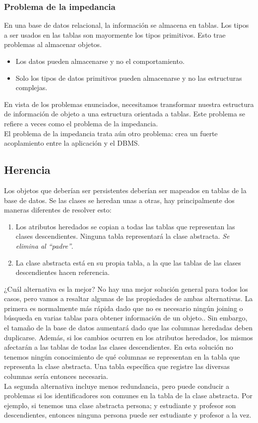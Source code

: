 \subsubsection{Problema de la impedancia}
En una base de datos relacional, la información se almacena en tablas. Los tipos a ser usados en las tablas son mayormente los tipos primitivos. Esto trae problemas al almacenar objetos.
\begin{itemize}
\item Los datos pueden almacenarse y no el comportamiento.
\item Solo los tipos de datos primitivos pueden almacenarse y no las estructuras complejas.
\end{itemize}
En vista de los problemas enunciados, necesitamos transformar nuestra estructura de información de objeto a una estructura orientada a tablas. Este problema se refiere a veces como el problema de la impedancia.\\
El problema de la impedancia trata aún otro problema: crea un fuerte acoplamiento entre la aplicación y el DBMS.\\
\subsection{Herencia}
Los objetos que deberían ser persistentes deberían ser mapeados en tablas de la base de datos. Se las clases se heredan unas a otras, hay principalmente dos maneras diferentes de resolver esto:
\begin{enumerate}
\item Los atributos heredados se copian a todas las tablas que representan las clases descendientes. Ninguna tabla representará la clase abstracta. \emph{Se elimina al ``padre''}.
\item La clase abstracta está en su propia tabla, a la que las tablas de las clases descendientes hacen referencia.
\end{enumerate}
¿Cuál alternativa es la mejor? No hay una mejor solución general para todos los casos, pero vamos a resaltar algunas de las propiedades de ambas alternativas. La primera es normalmente más rápida dado que no es necesario ningún joining o búsqueda en varias tablas para obtener información de un objeto.. Sin embargo, el tamaño de la base de datos aumentará dado que las columnas heredadas deben duplicarse. Además, si los cambios ocurren en los atributos heredados, los mismos afectarán a las tablas de todas las clases descendientes. En esta solución no tenemos ningún conocimiento de qué columnas se representan en la tabla que representa la clase abstracta. Una tabla específica que registre las diversas columnas sería entonces necesaria.\\
La segunda alternativa incluye menos redundancia, pero puede conducir a problemas si los identificadores son comunes en la tabla de la clase abstracta. Por ejemplo, si tenemos una clase abstracta persona; y estudiante y profesor son descendientes, entonces ninguna persona puede ser estudiante y profesor a la vez.
